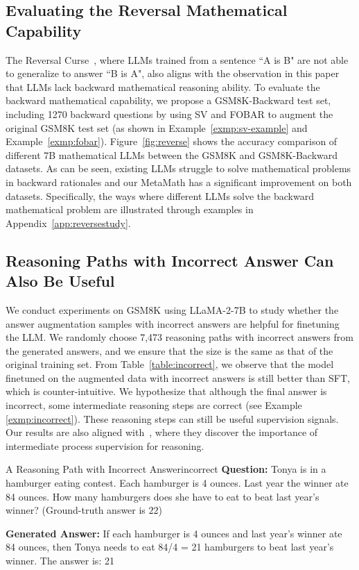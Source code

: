 \subsection{Evaluating the Reversal Mathematical Capability}

The Reversal Curse~\citep{berglund2023reversal}, where LLMs trained from a sentence ``A is B" are not able to generalize to answer ``B is A", also aligns with the observation in this paper that LLMs lack backward mathematical reasoning ability. To evaluate the backward mathematical capability, we propose a GSM8K-Backward test set, including 1270 backward questions by using SV and FOBAR to augment the original GSM8K test set (as shown in Example~\ref{exmp:sv-example} and Example~\ref{exmp:fobar}). 
Figure~\ref{fig:reverse} shows the accuracy comparison of different 7B mathematical LLMs between the GSM8K and GSM8K-Backward datasets. As can be seen, existing LLMs struggle to solve mathematical problems in backward rationales and our MetaMath has a significant improvement on both datasets. Specifically, the ways where different LLMs solve the backward mathematical problem are illustrated through examples in Appendix~\ref{app:reversestudy}.

    \subsection{Reasoning Paths with Incorrect Answer Can Also Be Useful}

    We conduct experiments on GSM8K using {LLaMA-2-7B} to study whether the answer augmentation samples with incorrect answers are helpful for finetuning the LLM. We randomly choose 7,473 reasoning paths with incorrect answers from the generated answers, and we ensure that the size is the same as that of the original training set. From Table~\ref{table:incorrect}, we observe that the model finetuned on the augmented data with incorrect answers is still better than SFT, which is counter-intuitive. We hypothesize that although the final answer is incorrect, some intermediate reasoning steps are correct (see Example \ref{exmp:incorrect}). These reasoning steps can still be useful supervision signals. Our results are also aligned with~\citep{lightman2023let}, where they discover the importance of intermediate process supervision for reasoning.

\begin{exmp}{A Reasoning Path with Incorrect Answer}{incorrect}\small
    \textbf{Question:} Tonya is in a hamburger eating contest. Each hamburger is 4 ounces. Last year the winner ate 84 ounces. How many hamburgers does she have to eat to beat last year's winner? {\color{red3}(Ground-truth answer is $22$)}

    \textbf{Generated Answer:} If each hamburger is 4 ounces and last year's winner ate 84 ounces, then Tonya needs to eat 84/4 = 21 hamburgers to beat last year's winner. The answer is: 21
    \end{exmp}

